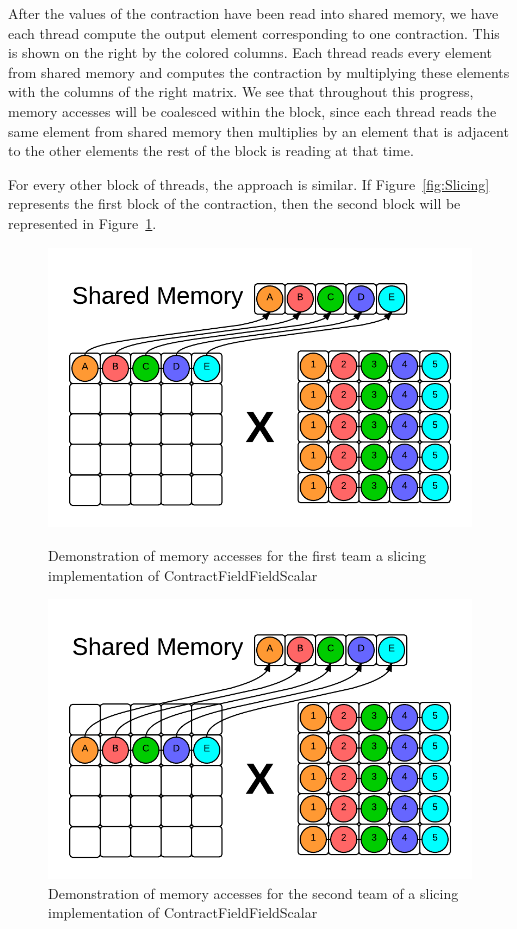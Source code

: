     After the values of the contraction have been read into shared memory, we
have each thread compute the output element corresponding to one contraction.
This is shown on the right by the colored columns. Each thread reads every
element from shared memory and computes the contraction by multiplying these
elements with the columns of the right matrix. We see that throughout this
progress, memory accesses will be coalesced within the block, since each thread
reads the same element from shared memory then multiplies by an element that is
adjacent to the other elements the rest of the block is reading at that time. 
	
    For every other block of threads, the approach is similar. If Figure~\ref{fig:Slicing}
represents the first block of the contraction, then the second block will be
represented in Figure~\ref{fig:Slicing2}. 

\begin{figure}[H]
    \centering
    \includegraphics[scale = .55]{ContractFieldFieldScalarGraphic}
    \caption{Demonstration of memory accesses for the first team a slicing implementation of ContractFieldFieldScalar}

    \includegraphics[scale = .55]{ContractFieldFieldScalarGraphic2}
    \caption{Demonstration of memory accesses for the second team of a slicing implementation of ContractFieldFieldScalar}
\label{fig:Slicing2}
\end{figure}

